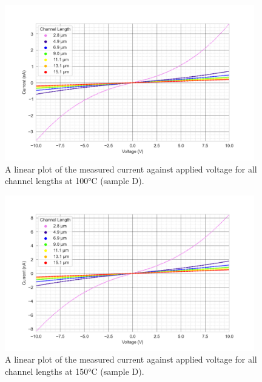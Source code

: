 \begin{figure}[h]
    \centering
    \includegraphics[width=0.97\textwidth]{Chapter3/Figs/Raster/Sample D 2019/IV/10V IV characteristics at 100 C.png}
    \caption{A linear plot of the measured current against applied voltage for all channel lengths at 100\si{\degreeCelsius} (sample D).}
    \label{appfig:D_current_voltage_100_10V}
\end{figure}
\begin{figure}[h]
    \centering
    \includegraphics[width=0.97\textwidth]{Chapter3/Figs/Raster/Sample D 2019/IV/10V IV characteristics at 150 C.png}
    \caption{A linear plot of the measured current against applied voltage for all channel lengths at 150\si{\degreeCelsius} (sample D).}
    \label{appfig:D_current_voltage_150_10V}
\end{figure}
